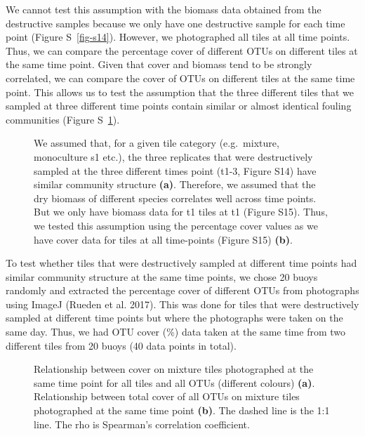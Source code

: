 \documentclass[
  letterpaper,
  DIV=11,
  numbers=noendperiod]{scrartcl}
\begin{document}
We cannot test this assumption with the biomass data obtained from the
destructive samples because we only have one destructive sample for each
time point (Figure S~\ref{fig-s14}). However, we photographed all tiles
at all time points. Thus, we can compare the percentage cover of
different OTUs on different tiles at the same time point. Given that
cover and biomass tend to be strongly correlated, we can compare the
cover of OTUs on different tiles at the same time point. This allows us
to test the assumption that the three different tiles that we sampled at
three different time points contain similar or almost identical fouling
communities (Figure S~\ref{fig-s15}).

\begin{figure}


\caption{\label{fig-s15}We assumed that, for a given tile category
(e.g.~mixture, monoculture s1 etc.), the three replicates that were
destructively sampled at the three different times point (t1-3, Figure
S14) have similar community structure \textbf{(a)}. Therefore, we
assumed that the dry biomass of different species correlates well across
time points. But we only have biomass data for t1 tiles at t1 (Figure
S15). Thus, we tested this assumption using the percentage cover values
as we have cover data for tiles at all time-points (Figure S15)
\textbf{(b)}.}

\end{figure}%

To test whether tiles that were destructively sampled at different time
points had similar community structure at the same time points, we chose
20 buoys randomly and extracted the percentage cover of different OTUs
from photographs using ImageJ (Rueden et al. 2017). This was done for
tiles that were destructively sampled at different time points but where
the photographs were taken on the same day. Thus, we had OTU cover (\%)
data taken at the same time from two different tiles from 20 buoys (40
data points in total).

\begin{figure}


\caption{\label{fig-s16}Relationship between cover on mixture tiles
photographed at the same time point for all tiles and all OTUs
(different colours) \textbf{(a)}. Relationship between total cover of
all OTUs on mixture tiles photographed at the same time point
\textbf{(b)}. The dashed line is the 1:1 line. The rho is Spearman's
correlation coefficient.}

\end{figure}%
\end{document}

